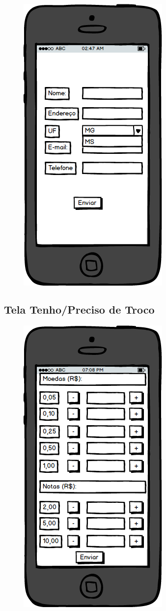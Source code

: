 \documentclass[a4paper,10pt]{article}
\begin{document}
\begin{figure}[H]
    \centering
    \includegraphics[scale=0.7]{t1_img/Cadastro.png}
\end{figure}

\subsection*{Tela Tenho/Preciso de Troco}

\begin{figure}[H]
    \centering
    \includegraphics[scale=0.7]{t1_img/Troco.png}
\end{figure}
\end{document}
